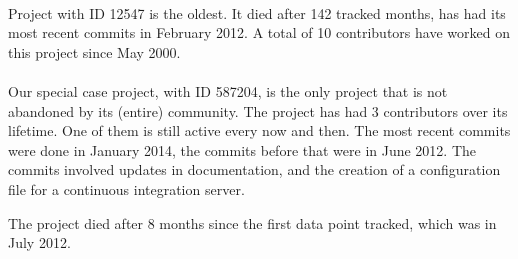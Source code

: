 \paragraph{}
Project with ID 12547 is the oldest. It died after 142 tracked months, has had
its most recent commits in February 2012. A total of 10 contributors have
worked on this project since May 2000.

\paragraph{}
Our special case project, with ID 587204, is the only project that is not
abandoned by its (entire) community. The project has had 3 contributors over its
lifetime. One of them is still active every now and then. The most recent
commits were done in January 2014, the commits before that were in June 2012.
The commits involved updates in documentation, and the creation of a
configuration file for a continuous integration server.

The project died after 8 months since the first data point tracked, which was in
July 2012.

\begin{comment}
This chapter presents and clarifies the results obtained during the research.
The focus should be on the factual results, not the interpretation or
discussion. Tables and graphics should be used to increase the clarity of the
results where applicable.
Have a look at the the results chapter in this example thesis on Paul’s
homepage\footnote{http://homepages.cwi.nl/~paulk/thesesMasterSoftwareEngineering/2006/ArnoldLankamp.pdf}.
\end{comment}
